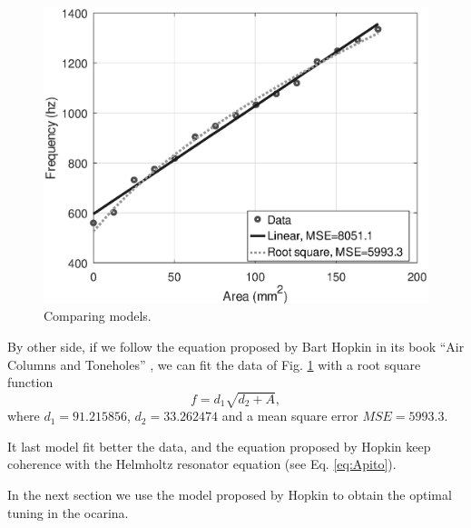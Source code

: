 \documentclass{article}
\begin{document}
\begin{figure}[ht!]
\centering
\includegraphics[width=0.750\columnwidth]{compara.eps}
\caption{Comparing models. }
\label{fig:models}
\end{figure}

By other side, 
if we follow the equation proposed by Bart Hopkin in its book ``Air Columns and Toneholes'' 
\cite[pp. 44]{cabreraestudio} \cite{1999air},
we can fit the data of Fig. \ref{fig:models} with a root square function
\begin{equation}
f=d_1\sqrt{d_2+A},
\end{equation}
where $d_1=91.215856$, $d_2=33.262474$ and a mean square error $MSE=5993.3$.

It last model fit better the data, and the equation proposed by Hopkin
keep coherence with the Helmholtz resonator equation (see Eq. \ref{eq:Apito}).

In the next section we use the model proposed by Hopkin to obtain the optimal tuning in the ocarina.

\end{document}
